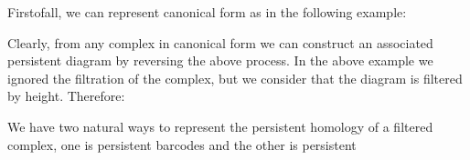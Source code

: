 
Firstofall, we can represent canonical form as in the following example:



Clearly, from any complex in canonical form we can construct an associated persistent diagram by reversing the above process.
In the above example we ignored the filtration of the complex, but we consider that the diagram is filtered by height.
 Therefore:

%
%



%


We have two natural ways to represent the persistent homology of a 
filtered complex, one is persistent barcodes and the other is persistent 

